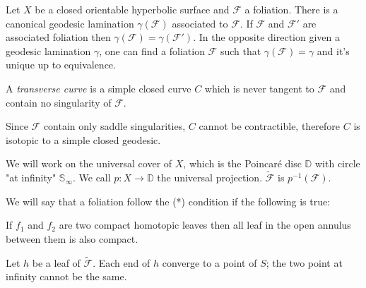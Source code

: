 \begin{thm}
Let $X$ be a closed orientable hyperbolic surface and $\mathcal{F}$ a foliation. There is a canonical geodesic lamination $\gamma(\mathcal{F})$ associated to $\mathcal{F}$. If $\mathcal{F}$ and $\mathcal{F}'$ are associated foliation then $\gamma(\mathcal{F})= \gamma(\mathcal{F}')$. In the opposite direction given a geodesic lamination $\gamma$, one can find a foliation $\mathcal{F}$ such that $\gamma(\mathcal{F})=\gamma$ and it's unique up to equivalence.
\end{thm}


\begin{dfnt}
A \emph{transverse curve} is a simple closed curve $C$ which is never tangent to $\mathcal{F}$ and contain no singularity of $\mathcal{F}$.
\end{dfnt}

\begin{rmq}
Since $\mathcal{F}$ contain only saddle singularities, $C$ cannot be contractible, therefore $C$ is isotopic to a simple closed geodesic.
\end{rmq}

We will work on the universal cover of $X$, which is the Poincaré disc $\mathbb{D}$ with circle "at infinity" $\mathbb{S}_{\infty}$. We call $p:X \to \mathbb{D}$ the universal projection.
$\mathcal{\tilde{F}}$ is $p^{-1}(\mathcal{F})$.

We will say that a foliation follow the (*) condition if the following is true:
\begin{center}
If $f_1$ and $f_2$ are two compact homotopic leaves then all leaf in the open annulus between them  is also compact.
\end{center}

\begin{lem}
Let $h$ be a leaf of $\mathcal{\tilde{F}}$. Each end of $h$ converge to a point of $S$; the two point at infinity cannot be the same.
\end{lem}

